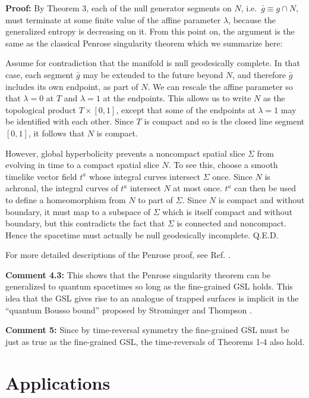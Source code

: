 \documentclass[12pt]{article}
\begin{document}
\textbf{Proof:} By Theorem 3, each of the null generator segments on $N$, i.e.~$\bar{g} \equiv g \cap N$, must terminate at some finite value of the affine parameter $\lambda$, because the generalized entropy is decreasing on it.  From this point on, the argument is the same as the classical Penrose singularity theorem \cite{HawkingEllis} which we summarize here:

Assume for contradiction that the manifold is null geodesically complete.  In that case, each segment $\bar{g}$ may be extended to the future beyond $N$, and therefore $\bar{g}$ includes its own endpoint, as part of $N$.  We can rescale the affine parameter so that $\lambda = 0$ at $T$ and $\lambda = 1$ at the endpoints.  This allows us to write $N$ as the topological product $T \times [0, 1]$, except that some of the endpoints at $\lambda = 1$ may be identified with each other.  Since $T$ is compact and so is the closed line segment $[0, 1]$, it follows that $N$ is compact.

However, global hyperbolicity prevents a noncompact spatial slice $\Sigma$ from evolving in time to a compact spatial slice $N$.  To see this, choose a smooth timelike vector field $t^a$ whose integral curves intersect $\Sigma$ once.  Since $N$ is achronal, the integral curves of $t^a$ intersect $N$ at most once.  $t^a$ can then be used to define a homeomorphism from $N$ to part of $\Sigma$.  Since $N$ is compact and without boundary, it must map to a subspace of $\Sigma$ which is itself compact and without boundary, but this contradicts the fact that $\Sigma$ is connected and noncompact.  Hence the spacetime must actually be null geodesically incomplete.  Q.E.D.

For more detailed descriptions of the Penrose proof, see Ref. \cite{HawkingEllis}.

\textbf{Comment 4.3:}  This shows that the Penrose singularity theorem can be generalized to quantum spacetimes so long as the fine-grained GSL holds.  This idea that the GSL gives rise to an analogue of trapped surfaces is implicit in the ``quantum Bousso bound'' proposed by Strominger and Thompson \cite{ST}.

\textbf{Comment 5:} Since by time-reversal symmetry the fine-grained $\overline{\mathrm{GSL}}$ must be just as true as the fine-grained GSL, the time-reversals of Theorems 1-4 also hold.

\section{Applications}\label{app}
\end{document}
